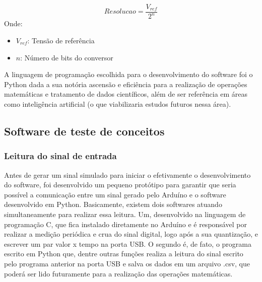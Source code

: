 \begin{equation} \label{eq:resolucaoArduino}
	Resolucao = \dfrac{V_{ref}}{2^n}
\end{equation}
Onde:
\begin{itemize}[label=]
	\item $V_{ref}$: Tensão de referência
	\item $n$: Número de bits do conversor
\end{itemize} 

A linguagem de programação escolhida para o desenvolvimento do software foi o Python dada a sua notória ascensão e eficiência para a realização de operações matemáticas e tratamento de dados científicos, além de ser referência em áreas como inteligência artificial (o que viabilizaria estudos futuros nessa área).

\subsection{Software de teste de conceitos}

\subsubsection{Leitura do sinal de entrada} \label{sub:LeituraSinalEntrada}


Antes de gerar um sinal simulado para iniciar o efetivamente o desenvolvimento do software, foi desenvolvido um pequeno protótipo para garantir que seria possível a comunicação entre um sinal gerado pelo Arduíno e o software desenvolvido em Python. Basicamente, existem dois softwares atuando simultaneamente para realizar essa leitura. Um, desenvolvido na linguagem de programação C, que fica instalado diretamente no Arduíno e é responsável por realizar a medição periódica e crua do sinal digital, logo após a sua quantização, e escrever um par valor x tempo na porta USB. O segundo é, de fato, o programa escrito em Python que, dentre outras funções realiza a leitura do sinal escrito pelo programa anterior na porta USB e salva os dados em um arquivo .csv, que poderá ser lido futuramente para a realização das operações matemáticas.


